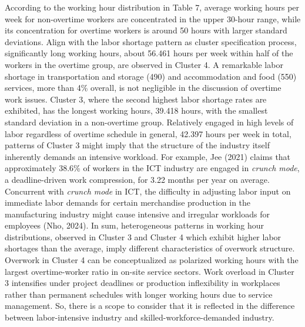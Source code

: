 \documentclass[
  12pt,
]{article}
\begin{document}
According to the working hour distribution in Table 7, average working
hours per week for non-overtime workers are concentrated in the upper
30-hour range, while its concentration for overtime workers is around 50
hours with larger standard deviations. Align with the labor shortage
pattern as cluster specification process, significantly long working
hours, about 56.461 hours per week within half of the workers in the
overtime group, are observed in Cluster 4. A remarkable labor shortage
in transportation and storage (490) and accommodation and food (550)
services, more than 4\% overall, is not negligible in the discussion of
overtime work issues. Cluster 3, where the second highest labor shortage
rates are exhibited, has the longest working hours, 39.418 hours, with
the smallest standard deviation in a non-overtime group. Relatively
engaged in high levels of labor regardless of overtime schedule in
general, 42.397 hours per week in total, patterns of Cluster 3 might
imply that the structure of the industry itself inherently demands an
intensive workload. For example, Jee (2021) claims that approximately
38.6\% of workers in the ICT industry are engaged in \emph{crunch mode},
a deadline-driven work compression, for 3.22 months per year on average.
Concurrent with \emph{crunch mode} in ICT, the difficulty in adjusting
labor input on immediate labor demands for certain merchandise
production in the manufacturing industry might cause intensive and
irregular workloads for employees (Nho, 2024). In sum, heterogeneous
patterns in working hour distributions, observed in Cluster 3 and
Cluster 4 which exhibit higher labor shortages than the average, imply
different characteristics of overwork structure. Overwork in Cluster 4
can be conceptualized as polarized working hours with the largest
overtime-worker ratio in on-site service sectors. Work overload in
Cluster 3 intensifies under project deadlines or production
inflexibility in workplaces rather than permanent schedules with longer
working hours due to service management. So, there is a scope to
consider that it is reflected in the difference between labor-intensive
industry and skilled-workforce-demanded industry.
\end{document}
